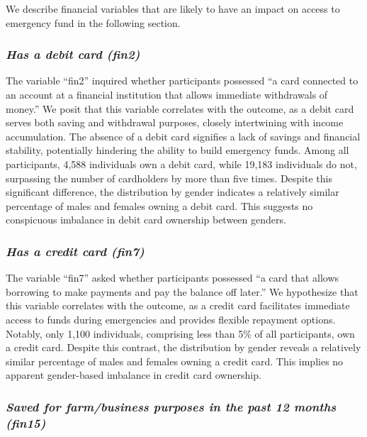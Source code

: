 \documentclass[12pt]{article}
\begin{document}
We describe financial variables that are likely to have an impact on
access to emergency fund in the following section.

\hypertarget{has-a-debit-card-fin2}{%
\subsubsection{\texorpdfstring{\emph{Has a debit card
(fin2)}}{Has a debit card (fin2)}}\label{has-a-debit-card-fin2}}

The variable ``fin2'' inquired whether participants possessed ``a card
connected to an account at a financial institution that allows immediate
withdrawals of money.'' We posit that this variable correlates with the
outcome, as a debit card serves both saving and withdrawal purposes,
closely intertwining with income accumulation. The absence of a debit
card signifies a lack of savings and financial stability, potentially
hindering the ability to build emergency funds. Among all participants,
4,588 individuals own a debit card, while 19,183 individuals do not,
surpassing the number of cardholders by more than five times. Despite
this significant difference, the distribution by gender indicates a
relatively similar percentage of males and females owning a debit card.
This suggests no conspicuous imbalance in debit card ownership between
genders.

\hypertarget{has-a-credit-card-fin7}{%
\subsubsection{\texorpdfstring{\emph{Has a credit card
(fin7)}}{Has a credit card (fin7)}}\label{has-a-credit-card-fin7}}

The variable ``fin7'' asked whether participants possessed ``a card that
allows borrowing to make payments and pay the balance off later.'' We
hypothesize that this variable correlates with the outcome, as a credit
card facilitates immediate access to funds during emergencies and
provides flexible repayment options. Notably, only 1,100 individuals,
comprising less than 5\% of all participants, own a credit card. Despite
this contrast, the distribution by gender reveals a relatively similar
percentage of males and females owning a credit card. This implies no
apparent gender-based imbalance in credit card ownership.

\hypertarget{saved-for-farmbusiness-purposes-in-the-past-12-months-fin15}{%
\subsubsection{\texorpdfstring{\emph{Saved for farm/business purposes in
the past 12 months
(fin15)}}{Saved for farm/business purposes in the past 12 months (fin15)}}\label{saved-for-farmbusiness-purposes-in-the-past-12-months-fin15}}
\end{document}
